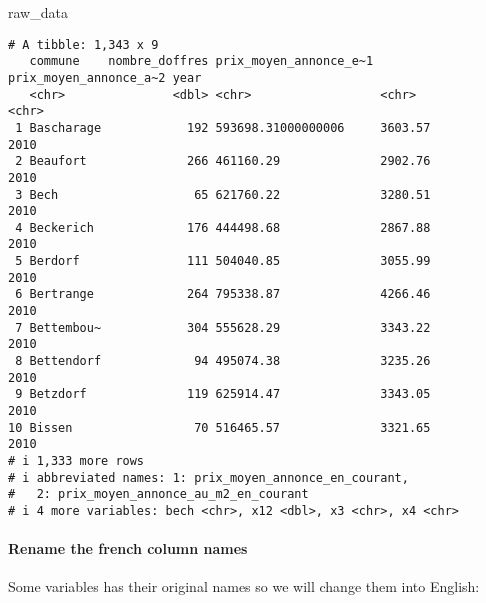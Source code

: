 \documentclass[
  letterpaper,
  DIV=11,
  numbers=noendperiod]{scrartcl}
\let\oldparagraph\paragraph
\renewcommand{\paragraph}[1]{\oldparagraph{#1}\mbox{}}
\newenvironment{Shaded}{\begin{snugshade}}{\end{snugshade}}
\newcommand{\NormalTok}[1]{\textcolor[rgb]{0.00,0.23,0.31}{#1}}
\begin{document}
\begin{Shaded}
\begin{Highlighting}[]
\NormalTok{raw\_data}
\end{Highlighting}
\end{Shaded}

\begin{verbatim}
# A tibble: 1,343 x 9
   commune    nombre_doffres prix_moyen_annonce_e~1 prix_moyen_annonce_a~2 year 
   <chr>               <dbl> <chr>                  <chr>                  <chr>
 1 Bascharage            192 593698.31000000006     3603.57                2010 
 2 Beaufort              266 461160.29              2902.76                2010 
 3 Bech                   65 621760.22              3280.51                2010 
 4 Beckerich             176 444498.68              2867.88                2010 
 5 Berdorf               111 504040.85              3055.99                2010 
 6 Bertrange             264 795338.87              4266.46                2010 
 7 Bettembou~            304 555628.29              3343.22                2010 
 8 Bettendorf             94 495074.38              3235.26                2010 
 9 Betzdorf              119 625914.47              3343.05                2010 
10 Bissen                 70 516465.57              3321.65                2010 
# i 1,333 more rows
# i abbreviated names: 1: prix_moyen_annonce_en_courant,
#   2: prix_moyen_annonce_au_m2_en_courant
# i 4 more variables: bech <chr>, x12 <dbl>, x3 <chr>, x4 <chr>
\end{verbatim}

\hypertarget{rename-the-french-column-names}{%
\paragraph{Rename the french column
names}\label{rename-the-french-column-names}}

Some variables has their original names so we will change them into
English:
\end{document}
